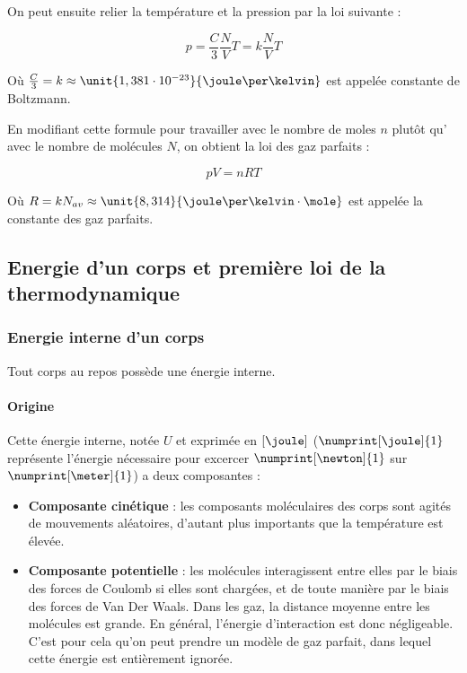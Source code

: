 On peut ensuite relier la température et la pression par la loi suivante :

$$p = \frac{C}{3} \frac{N}{V} T = k \frac{N}{V} T$$

Où $\frac{C}{3} = k \approx \unit{1,381 \cdot 10^{-23}}{\joule\per\kelvin}$ est appelée constante
de Boltzmann.

En modifiant cette formule pour travailler avec le nombre de moles $n$ plutôt qu'
avec le nombre de molécules $N$, on obtient la loi des gaz parfaits :

$$pV = nRT$$

Où $R = kN_{av} \approx \unit{8,314}{\joule\per\kelvin\cdot\mole}$ est appelée la constante
des gaz parfaits.

\subsection{Energie d'un corps et première loi de la thermodynamique}

\subsubsection{Energie interne d'un corps}
Tout corps au repos possède une énergie interne.

\paragraph{Origine}
Cette énergie interne, notée $U$ et exprimée en $[\joule]$ ($\numprint[\joule]{1}$ représente 
l'énergie nécessaire pour excercer $\numprint[\newton]{1}$ sur $\numprint[\meter]{1}$) 
a deux composantes :

\begin{itemize}
	\item \textbf{Composante cinétique} : les composants moléculaires des corps sont agités
				de mouvements aléatoires, d'autant plus importants que la température
				est élevée.
	\item \textbf{Composante potentielle} : les molécules interagissent entre elles par le biais
				des forces de Coulomb si elles sont chargées, et de toute manière par le biais
				des forces de Van Der Waals. Dans les gaz, la distance moyenne entre les 
				molécules est grande. En général, l'énergie d'interaction est donc négligeable.
				C'est pour cela qu'on peut prendre un modèle de gaz parfait, dans lequel cette
				énergie est entièrement ignorée.
\end{itemize} 


